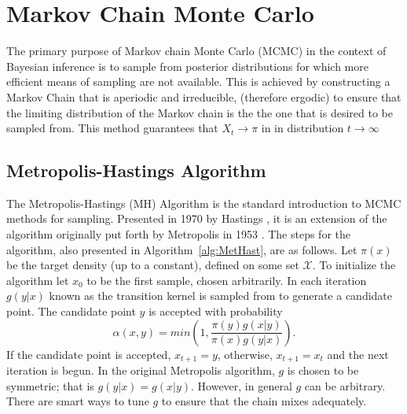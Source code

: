\section{Markov Chain Monte Carlo}
	The primary purpose of Markov chain Monte Carlo (MCMC) in the context of Bayesian inference is to sample from posterior distributions for which more efficient means of sampling are not available.
	{\color{red}This is achieved by constructing a Markov Chain that is aperiodic and irreducible, (therefore ergodic) to ensure that the limiting distribution of the Markov chain is the the one that is desired to be sampled from. This method guarantees that $X_t\rightarrow\pi$ in in distribution $t\rightarrow\infty$}
	\subsection{Metropolis-Hastings Algorithm}
	The Metropolis-Hastings (MH) Algorithm is the standard introduction to MCMC methods for sampling. Presented in 1970 by Hastings \cite{hastings1970monte}, it is an extension of the algorithm originally put forth by Metropolis in 1953 \cite{metropolis1953equation}.
	The steps for the algorithm, also presented in Algorithm~\ref{alg:MetHast}, are as follows. Let $\pi(x)$ be the target density (up to a constant), defined on some set ${\mathscr X}$.
	To initialize the algorithm let $x_0$ to be the first sample, chosen arbitrarily. In each iteration $g(y|x)$ 
    known as the {\color{red}transition kernel} is sampled from to generate a candidate point. The candidate point $y$ is accepted with probability 
	    \begin{equation}
	        \alpha(x,y) = min\left(1,\frac{\pi(y)g(x|y)}{\pi(x)g(y|x)}\right).
	    \end{equation}
	If the candidate point is accepted, $x_{t+1} = y$, otherwise, $x_{t+1} = x_t$ and the next iteration is begun. In the original Metropolis algorithm, $g$ is chosen to be symmetric; that is $g(y|x) = g(x|y)$. However, in general $g$ can be arbitrary. There are smart ways to tune $g$ to ensure that the chain mixes adequately.
	
